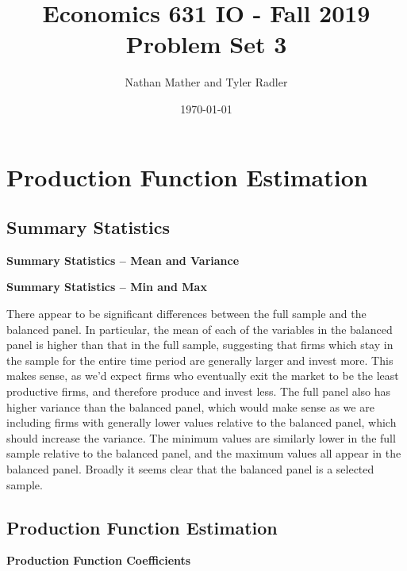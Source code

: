 \documentclass{article}
\title{Economics 631 IO - Fall 2019\\Problem Set 3}
\author{Nathan Mather and Tyler Radler}
\date{\today}
\newcommand{\1}{\mathbbm{1}}
\begin{document}
\maketitle

\section{Production Function Estimation}

\subsection{Summary Statistics}

\begin{center}
	\centering
	\textbf{Summary Statistics -- Mean and Variance}\par\medskip
	\scalebox{1}{
		
	}
\end{center}

\begin{center}
	\centering
	\textbf{Summary Statistics -- Min and Max}\par\medskip
	\scalebox{1}{
		
	}
\end{center}

There appear to be significant differences between the full sample and the balanced panel. In particular, the mean of each of the variables in the balanced panel is higher than that in the full sample, suggesting that firms which stay in the sample for the entire time period are generally larger and invest more. This makes sense, as we'd expect firms who eventually exit the market to be the least productive firms, and therefore produce and invest less. The full panel also has higher variance than the balanced panel, which would make sense as we are including firms with generally lower values relative to the balanced panel, which should increase the variance. The minimum values are similarly lower in the full sample relative to the balanced panel, and the maximum values all appear in the balanced panel. Broadly it seems clear that the balanced panel is a selected sample.

\subsection{Production Function Estimation}

\begin{center}
	\centering
	\textbf{Production Function Coefficients}\par\medskip
	\scalebox{1}{
		
	}
\end{center}
\end{document}
